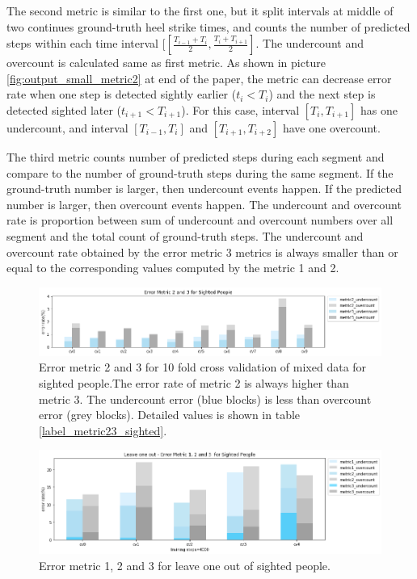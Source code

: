 \documentclass[11pt]{article}
\begin{document}
{The second metric is similar to the first one,  but it  split intervals at middle of two continues ground-truth heel strike times, and counts the number of predicted steps within each time interval $[[\frac{T_{i-1}+T_i}{2}, \frac{T_i+T_{i+1}}{2}]$. The undercount and overcount is calculated same as first metric. As shown in picture \ref{fig:output_small_metric2} at end of the paper,  the metric can decrease error rate when one step is detected sightly earlier ($t_i<T_i$) and the next step is detected sighted later ($t_{i+1}<T_{i+1}$). For this case, interval $[T_i, T_{i+1}]$ has one undercount, and interval $[T_{i-1}, T_i]$ and $[T_{i+1}, T_{i+2}]$ have one overcount.

The third metric counts number of predicted steps during each segment and compare to the number of ground-truth steps during the same segment. If the ground-truth number is larger, then undercount events happen. If the predicted number is larger, then overcount events happen. The undercount and overcount rate is proportion between sum of undercount and overcount numbers over all segment and the total count of ground-truth steps. The undercount and overcount rate obtained by the error metric 3 metrics is always smaller than or equal to the corresponding values computed by the metric 1 and 2.

\begin{figure}[ht]
\centering
\includegraphics[scale=0.5]{error_metric_23_na_10fold}
\caption{Error metric 2 and 3 for 10 fold cross validation of mixed data for sighted people.The error rate of metric 2 is always higher than metric 3. The undercount error (blue blocks) is less than overcount error (grey blocks). Detailed values is shown in table \ref{label_metric23_sighted}.}
\label{fig:error_metric_23_na_10fold}
\end{figure}

\begin{figure}[ht]
\centering
\includegraphics[scale=0.5]{error_metric_123_na_5fold}
\caption{Error metric 1, 2 and 3 for leave one out of sighted people.}
\label{fig:error_metric_123_na_5fold}
\end{figure}


}
\end{document}
